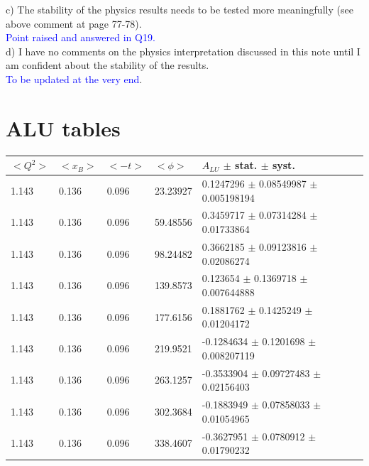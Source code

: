 c) The stability of the physics results needs to be tested more meaningfully 
(see above comment at page 77-78).\\
\textcolor{blue}{ Point raised and answered in Q19.}\\

d) I have no comments on the physics interpretation discussed in this note 
until I am confident about the stability of the results.\\
\textcolor{blue} { To be updated at the very end}.\\


\newpage
\newpage
\newpage
\newpage
\newpage
\section*{ALU tables}
\begin{table}[!h]
   \begin{center}
      \begin{tabular}{||l|l|l|l|l||}
         \hline
 $<Q^{2}>$ & $<x_{B}>$ & $<-t>$ & $<\phi>$ & $A_{LU}$ $\pm$ stat. $\pm$ syst.\\
         \hline
         1.143 & 0.136 & 0.096 & 23.23927  & 0.1247296  $\pm$  0.08549987 $\pm$ 
0.005198194 \\
         1.143 & 0.136 & 0.096 & 59.48556  & 0.3459717  $\pm$  0.07314284 $\pm$   
0.01733864  \\
         1.143 & 0.136 & 0.096 & 98.24482  & 0.3662185  $\pm$  0.09123816 $\pm$   
0.02086274  \\
         1.143 & 0.136 & 0.096 & 139.8573  & 0.123654   $\pm$  0.1369718  $\pm$   
0.007644888 \\
         1.143 & 0.136 & 0.096 & 177.6156  & 0.1881762  $\pm$  0.1425249  $\pm$   
0.01204172  \\
         1.143 & 0.136 & 0.096 & 219.9521  & -0.1284634 $\pm$  0.1201698  $\pm$   
0.008207119 \\
         1.143 & 0.136 & 0.096 & 263.1257  & -0.3533904 $\pm$  0.09727483  
$\pm$   0.02156403  \\
         1.143 & 0.136 & 0.096 & 302.3684  & -0.1883949 $\pm$  0.07858033  $\pm$   0.01054965  \\
         1.143 & 0.136 & 0.096 & 338.4607  & -0.3627951 $\pm$  0.0780912   $\pm$   0.01790232  \\
         \hline


\end{tabular}
\end{center}
\end{table}
